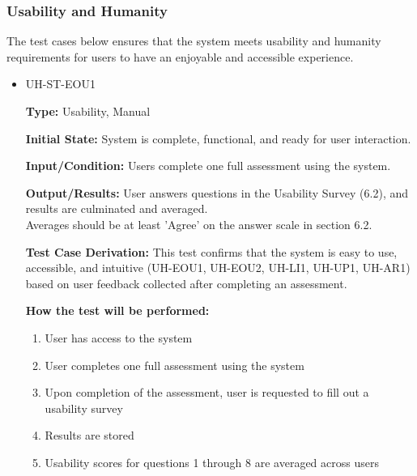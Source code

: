 \documentclass[12pt, titlepage]{article}
\begin{document}
\subsubsection{Usability and Humanity}
\hspace{2em}The test cases below ensures that the system meets usability and humanity
requirements for users to have an enjoyable and accessible experience.

\begin{itemize}
  \item UH-ST-EOU1
  \begin{mdframed}[linewidth=0.5mm]
      \textbf{Type:} Usability, Manual\par
      \textbf{Initial State:} System is complete, functional, and ready for user interaction. \par
      \textbf{Input/Condition:} Users complete one full assessment using the system. \par
      \textbf{Output/Results:} User answers questions in the Usability Survey (6.2), and results are culminated and averaged.\\
      Averages should be at least 'Agree' on the answer scale in section 6.2. \par
      \textbf{Test Case Derivation:} This test confirms that the system is easy to use, accessible, and intuitive (UH-EOU1, UH-EOU2, UH-LI1, UH-UP1, UH-AR1) based on user feedback collected after completing an assessment. \par
      \textbf{How the test will be performed:}
      \begin{enumerate}[noitemsep]
        \item User has access to the system
        \item User completes one full assessment using the system
        \item Upon completion of the assessment, user is requested to fill out a usability survey
        \item Results are stored
        \item Usability scores for questions 1 through 8 are averaged across users
      \end{enumerate}
  \end{mdframed}


\end{itemize}
\end{document}
